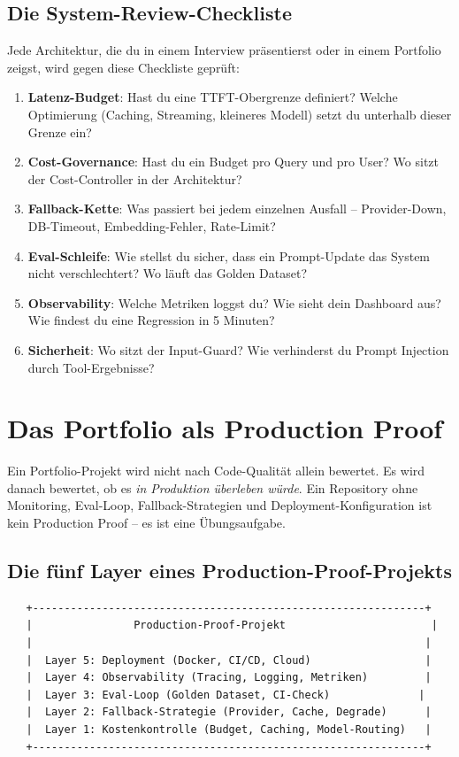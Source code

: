 \subsection{Die System-Review-Checkliste}

Jede Architektur, die du in einem Interview präsentierst oder in einem Portfolio zeigst, wird gegen diese Checkliste geprüft:

\begin{enumerate}[leftmargin=*]
    \item \textbf{Latenz-Budget}: Hast du eine TTFT-Obergrenze definiert? Welche Optimierung (Caching, Streaming, kleineres Modell) setzt du unterhalb dieser Grenze ein?
    \item \textbf{Cost-Governance}: Hast du ein Budget pro Query und pro User? Wo sitzt der Cost-Controller in der Architektur?
    \item \textbf{Fallback-Kette}: Was passiert bei jedem einzelnen Ausfall -- Provider-Down, DB-Timeout, Embedding-Fehler, Rate-Limit?
    \item \textbf{Eval-Schleife}: Wie stellst du sicher, dass ein Prompt-Update das System nicht verschlechtert? Wo läuft das Golden Dataset?
    \item \textbf{Observability}: Welche Metriken loggst du? Wie sieht dein Dashboard aus? Wie findest du eine Regression in 5 Minuten?
    \item \textbf{Sicherheit}: Wo sitzt der Input-Guard? Wie verhinderst du Prompt Injection durch Tool-Ergebnisse?
\end{enumerate}

\section{Das Portfolio als Production Proof}

Ein Portfolio-Projekt wird nicht nach Code-Qualität allein bewertet. Es wird danach bewertet, ob es \textit{in Produktion überleben würde}. Ein Repository ohne Monitoring, Eval-Loop, Fallback-Strategien und Deployment-Konfiguration ist kein Production Proof -- es ist eine Übungsaufgabe.

\subsection{Die fünf Layer eines Production-Proof-Projekts}

\begin{verbatim}
   +--------------------------------------------------------------+
   |                Production-Proof-Projekt                       |
   |                                                              |
   |  Layer 5: Deployment (Docker, CI/CD, Cloud)                  |
   |  Layer 4: Observability (Tracing, Logging, Metriken)         |
   |  Layer 3: Eval-Loop (Golden Dataset, CI-Check)              |
   |  Layer 2: Fallback-Strategie (Provider, Cache, Degrade)      |
   |  Layer 1: Kostenkontrolle (Budget, Caching, Model-Routing)   |
   +--------------------------------------------------------------+
\end{verbatim}

